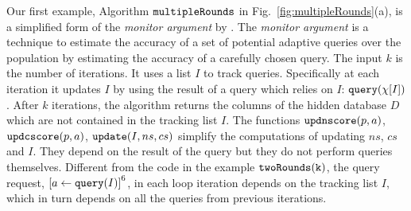 %
Our first example, Algorithm $\mathtt{multipleRounds}$ in Fig.~\ref{fig:multipleRounds}(a), is a simplified form of the \emph{monitor argument} by \citet{RogersRSSTW20}.
The \emph{monitor argument} is a technique to estimate the accuracy of a set of potential adaptive queries over 
the population by estimating the accuracy of a carefully chosen query.
The input $k$ is the number of iterations.
It uses a list $I$ to track queries. Specifically at each iteration it updates $I$ by using the result of a query which relies on $I$:  ${\tt query}(\chi[I])$.
After $k$ iterations, the algorithm returns the columns of the hidden database $D$ which are not contained in the  tracking list $I$.
The functions $\mathtt{updnscore}(p,a)$,
$\mathtt{updcscore}(p,a)$, $\mathtt{update}(I,ns,cs)$ simplify the computations of updating $ns$, $cs$ and $I$. They depend on the result of the query but they do not perform queries themselves. %
%
%
Different from the code in the example $\mathtt{twoRounds(k)}$,
the query request, $\clabel{\assign{a}{\query(I)}}^6$, in each loop iteration
depends on the tracking list $I$, which in turn depends on  all the queries from previous iterations. 
